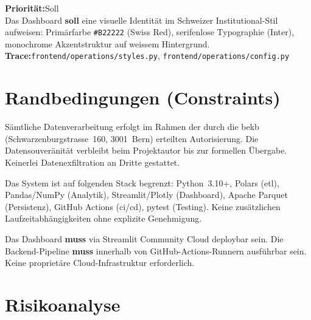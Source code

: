 \documentclass[11pt, a4paper, oneside, openany]{report}
\newcommand{\code}[1]{\texttt{\small\textcolor{DeepNavy}{#1}}}
\begin{document}
\vspace{6pt}

\begin{reqbox}
\textbf{Priorität:}\;Soll \\[4pt]
Das Dashboard \textbf{soll} eine visuelle Identität im Schweizer Institutional-Stil aufweisen: Primärfarbe \code{\#B22222} (Swiss Red), serifenlose Typographie (Inter), monochrome Akzentstruktur auf weissem Hintergrund. \\[4pt]
\textbf{Trace:}\;\code{frontend/operations/styles.py}, \code{frontend/operations/config.py}
\end{reqbox}

\section{Randbedingungen (Constraints)}
\label{sec:constraints}

\begin{constraintbox}
Sämtliche Datenverarbeitung erfolgt im Rahmen der durch die \gls{bekb} (Schwarzenburgstrasse~160, 3001~Bern) erteilten Autorisierung. Die Datensouveränität verbleibt beim Projektautor bis zur formellen Übergabe. Keinerlei Datenexfiltration an Dritte gestattet.
\end{constraintbox}

\vspace{6pt}

\begin{constraintbox}
Das System ist auf folgenden Stack begrenzt: Python~3.10+, Polars (\gls{etl}), Pandas/NumPy (Analytik), Streamlit/Plotly (Dashboard), Apache Parquet (Persistenz), GitHub Actions (\gls{ci}/\gls{cd}), pytest (Testing). Keine zusätzlichen Laufzeitabhängigkeiten ohne explizite Genehmigung.
\end{constraintbox}

\vspace{6pt}

\begin{constraintbox}
Das Dashboard \textbf{muss} via Streamlit Community Cloud deploybar sein. Die Backend-Pipeline \textbf{muss} innerhalb von GitHub-Actions-Runnern ausführbar sein. Keine proprietäre Cloud-Infrastruktur erforderlich.
\end{constraintbox}

\section{Risikoanalyse}
\label{sec:risiko}
\end{document}
